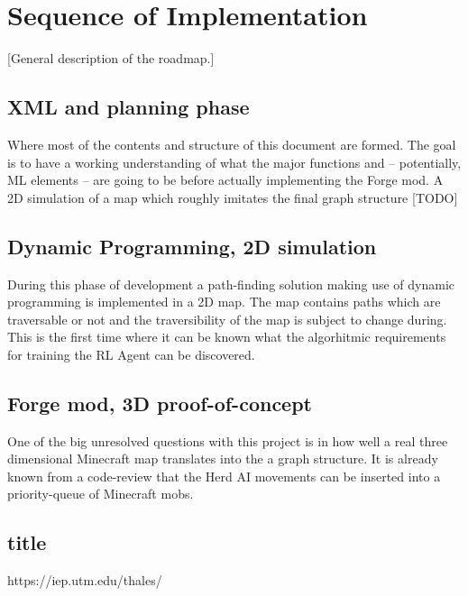 \documentclass[]{article}
\begin{document}
\section{Sequence of Implementation}

[General description of the roadmap.]

\subsection{XML and planning phase}

Where most of the contents and structure of this document are formed. The goal is to have a working understanding of what the major functions and -- potentially, ML elements -- are going to be before actually implementing the Forge mod. A 2D simulation of a map which roughly imitates the final graph structure [TODO]

\subsection{Dynamic Programming, 2D simulation}

During this phase of development a path-finding solution making use of dynamic programming is implemented in a 2D map. The map contains paths which are traversable or not and the traversibility of the map is subject to change during. This is the first time where it can be known what the algorhitmic requirements for training the RL Agent can be discovered.

\subsection{Forge mod, 3D proof-of-concept}

One of the big unresolved questions with this project is in how well a real three dimensional Minecraft map translates into the a graph structure. It is already known from a code-review that the Herd AI movements can be inserted into a priority-queue of Minecraft mobs.

\subsection{title}

\begin{thebibliography}
	
	 https://iep.utm.edu/thales/
	
\end{thebibliography}
\end{document}
